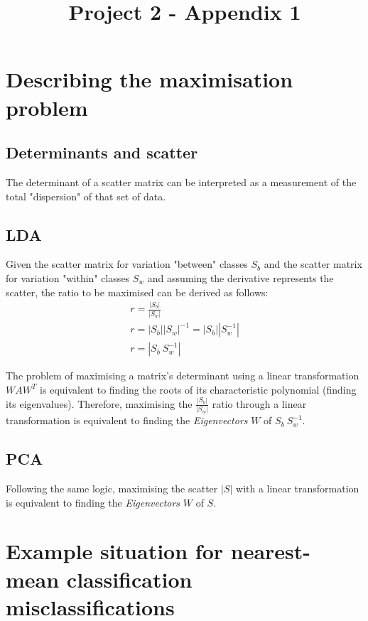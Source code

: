 \documentclass{bmvc2k}
\title{Project 2 - Appendix 1}
\begin{document}
\maketitle

\section{Describing the maximisation problem}
\subsection{Determinants and scatter}
The determinant of a scatter matrix can be interpreted as a measurement of the total "dispersion" of that set of data\cite{statanalysis}.
\subsection{LDA}
Given the scatter matrix for variation "between" classes $S_b$ and the scatter matrix for variation "within" classes $S_w$ and assuming the derivative represents the scatter, the ratio to be maximised can be derived as follows:
\begin{equation}
   \begin{split}
      r = \frac{|S_b|}{|S_w|}\\
      r = |S_b||S_w|^{-1} = |S_b||S_w^{-1}|\\
      r = |S_b\ S_w^{-1}|
   \end{split}
\end{equation}

The problem of maximising a matrix's determinant using a linear transformation $WAW^T$ is equivalent to finding the roots of its characteristic polynomial (finding its eigenvalues)\cite{detmax}. Therefore, maximising the $\frac{|S_b|}{|S_w|}$ ratio through a linear transformation is equivalent to finding the \textit{Eigenvectors} $W$ of $S_b\ S_w^{-1}$.

\subsection{PCA}
Following the same logic, maximising the scatter $|S|$ with a linear transformation is equivalent to finding the \textit{Eigenvectors} $W$ of $S$.

\section{Example situation for nearest-mean classification misclassifications}
\end{document}
